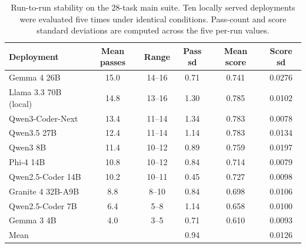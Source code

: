 \begin{table}[t]
\centering\small
\caption{Run-to-run stability on the 28-task main suite. Ten locally served deployments were
evaluated five times under identical conditions. Pass-count and score standard deviations are
computed across the five per-run values.}
\label{tab:replicates}
\begin{tabular}{lccccc}
\toprule
Deployment & Mean passes & Range & Pass sd & Mean score & Score sd \\
\midrule
Gemma 4 26B & 15.0 & 14--16 & 0.71 & 0.741 & 0.0276 \\
Llama 3.3 70B (local) & 14.8 & 13--16 & 1.30 & 0.785 & 0.0102 \\
Qwen3-Coder-Next & 13.4 & 11--14 & 1.34 & 0.783 & 0.0078 \\
Qwen3.5 27B & 12.4 & 11--14 & 1.14 & 0.783 & 0.0134 \\
Qwen3 8B & 11.4 & 10--12 & 0.89 & 0.759 & 0.0197 \\
Phi-4 14B & 10.8 & 10--12 & 0.84 & 0.714 & 0.0079 \\
Qwen2.5-Coder 14B & 10.2 & 10--11 & 0.45 & 0.727 & 0.0098 \\
Granite 4 32B-A9B & 8.8 & 8--10 & 0.84 & 0.698 & 0.0106 \\
Qwen2.5-Coder 7B & 6.4 & 5--8 & 1.14 & 0.658 & 0.0100 \\
Gemma 3 4B & 4.0 & 3--5 & 0.71 & 0.610 & 0.0093 \\
\midrule
Mean & & & 0.94 & & 0.0126 \\
\bottomrule
\end{tabular}
\end{table}

